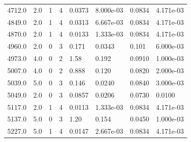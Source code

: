 \documentclass[preview]{standalone}
\begin{document}
{{{\begin{tabular}{L{1.2cm}C{1.2cm} C{0.3cm}C{0.5cm} C{1.4cm}C{1.4cm} C{1.4cm}C{1.4cm}}
  4712.0  &   2.0  & 1     &  4 &  0.0373  & 8.000e-03  & 0.0834 &  4.171e-03   \\ 
  4849.0  &   2.0  & 1     &  4 &  0.0313  & 6.667e-03  & 0.0834 &  4.171e-03   \\ 
  4870.0  &   2.0  & 1     &  4 &  0.0133  & 1.333e-03  & 0.0834 &  4.171e-03   \\ 
  4960.0  &   2.0  & 0     &  3 &  0.171  & 0.0343  & 0.101 &  6.000e-03   \\ 
  4973.0  &   4.0  & 0     &  2 &  1.58  & 0.192  & 0.0910 &  1.000e-03   \\ 
  5007.0  &   4.0  & 0     &  2 &  0.888  & 0.120  & 0.0820 &  2.000e-03   \\ 
  5039.0  &   5.0  & 0     &  3 &  0.146  & 0.0240  & 0.0840 &  3.000e-03   \\ 
  5049.0  &   2.0  & 0     &  3 &  0.0857  & 0.0206  & 0.0730 &  0.0100   \\ 
  5117.0  &   2.0  & 1     &  4 &  0.0113  & 1.333e-03  & 0.0834 &  4.171e-03   \\ 
  5137.0  &   5.0  & 0     &  3 &  1.20  & 0.154  & 0.0450 &  1.000e-03   \\ 
  5227.0  &   5.0  & 1     &  4 &  0.0147  & 2.667e-03  & 0.0834 &  4.171e-03   \\ 
\hline 
\end{tabular} 

}}}
\end{document}
